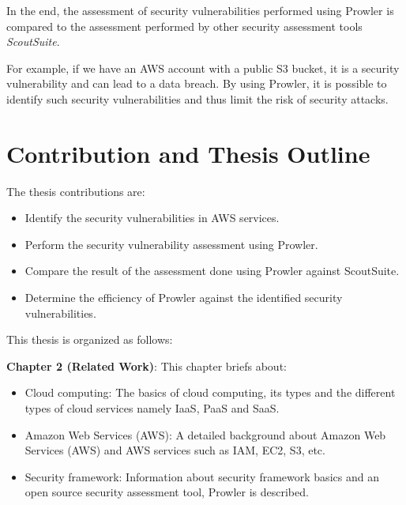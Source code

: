 \par In the end, the assessment of security vulnerabilities performed using Prowler is compared to the assessment performed by other security assessment tools \textit{ScoutSuite}.

\par For example, if we have an AWS account with a public S3 bucket, it is a security vulnerability and can lead to a data breach. By using Prowler, it is possible to identify such security vulnerabilities and thus limit the risk of security attacks.

\section{Contribution and Thesis Outline}
\par The thesis contributions are:
\begin{itemize}
    \item Identify the security vulnerabilities in AWS services.
\end{itemize}
\begin{itemize}
    \item Perform the security vulnerability assessment using Prowler.
\end{itemize}
\begin{itemize}
    \item Compare the result of the assessment done using Prowler against ScoutSuite.
\end{itemize}
\begin{itemize}
    \item Determine the efficiency of Prowler against the identified security vulnerabilities.
\end{itemize}

\par This thesis is organized as follows:
\par \textbf{Chapter 2 (Related Work)}: This chapter briefs about:
\begin{itemize}
    \item Cloud computing: The basics of cloud computing, its types and the different types of cloud services namely IaaS, PaaS and SaaS.
\end{itemize}
\begin{itemize}
    \item Amazon Web Services (AWS): A detailed background about Amazon Web Services (AWS) and AWS services such as IAM, EC2, S3, etc.
\end{itemize}
\begin{itemize}
    \item Security framework: Information about security framework basics and an open source security assessment tool, Prowler is described.
\end{itemize}

